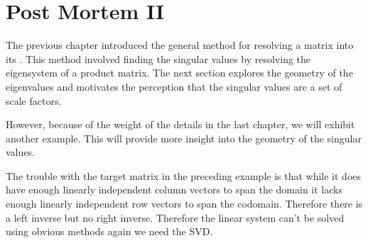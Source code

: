 \chapter{Post Mortem II}

The previous chapter introduced the general method for resolving a matrix into its \svdl. This method involved finding the singular values by resolving the eigensystem of a product matrix. The next section explores the geometry of the eigenvalues and motivates the perception that the singular values are a set of scale factors.

However, because of the weight of the details in the last chapter, we will exhibit another example. This will provide more insight into the geometry of the singular values.

The trouble with the target matrix in the preceding example is that while it does have enough linearly independent column vectors to span the domain it lacks enough linearly independent row vectors to span the codomain. Therefore there is a left inverse but no right inverse. Therefore the linear system can't be solved using obvious methods again we need the SVD.
 




\endinput
